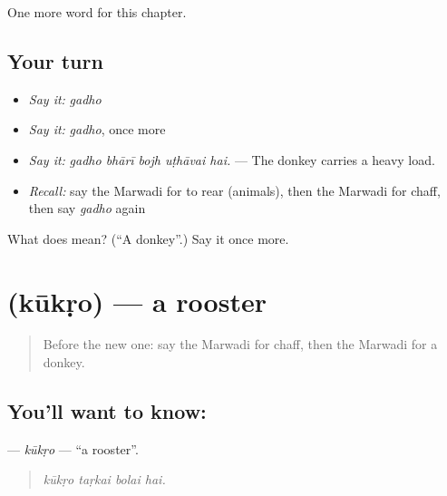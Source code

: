 \begin{grammarlens}[title={What you've built}]
One more word for this chapter.
\end{grammarlens}

\subsection*{Your turn}
\begin{itemize}
\raggedright
  \item \emph{Say it:} \emph{gadho}
  \item \emph{Say it:} \emph{gadho}, once more
  \item \emph{Say it:} \emph{gadho bhārī bojh uṭhāvai hai.} — The donkey carries a heavy load.
  \item \emph{Recall:} say the Marwadi for to rear (animals), then the Marwadi for chaff, then say \emph{gadho} again
\end{itemize}

\begin{tcolorbox}[breakable,colback=teal!4,colframe=teal!35!black,title={Before you move on}]
What does  mean? (\textquotedblleft{}A donkey\textquotedblright{}.) Say it once more.
\end{tcolorbox}
\section[\texorpdfstring{\mw{कूकड़ो} (kūkṛo)}{कूकड़ो (kūkṛo)}]{ (kūkṛo) — a rooster}

\label{lesson:MW-C236-kukro}



\begin{quote}
Before the new one: say the Marwadi for chaff, then the Marwadi for a donkey.
\end{quote}

\subsection*{You'll want to know: }
\textbf{} — \emph{kūkṛo} — \textquotedblleft{}a rooster\textquotedblright{}.

\begin{quote}
   
\end{quote}

\begin{quote}
\emph{kūkṛo taṛkai bolai hai.}
\end{quote}

